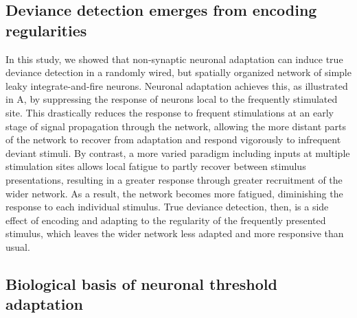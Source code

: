 \documentclass[9pt,lineno,onehalfspacing]{elife}
\begin{document}
\subsection{Deviance detection emerges from encoding regularities}

In this study, we showed that non-synaptic neuronal adaptation can induce true deviance detection in a randomly wired, but spatially organized network of simple leaky integrate-and-fire neurons. Neuronal adaptation achieves this, as illustrated in A, by suppressing the response of neurons local to the frequently stimulated site. This drastically reduces the response to frequent stimulations at an early stage of signal propagation through the network, allowing the more distant parts of the network to recover from adaptation and respond vigorously to infrequent deviant stimuli. By contrast, a more varied paradigm including inputs at multiple stimulation sites allows local fatigue to partly recover between stimulus presentations, resulting in a greater response through greater recruitment of the wider network. As a result, the network becomes more fatigued, diminishing the response to each individual stimulus. True deviance detection, then, is a side effect of encoding and adapting to the regularity of the frequently presented stimulus, which leaves the wider network less adapted and more responsive than usual.

\subsection{Biological basis of neuronal threshold adaptation}
\end{document}
